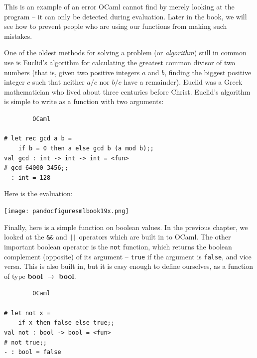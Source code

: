 \documentclass[]{book}
\newcommand{\smspace}{\vspace{4mm}}
\begin{document}
\noindent This is an example of an error OCaml cannot find by merely looking at the program -- it can only be detected during evaluation. Later in the book, we will see how to prevent people who are using our functions from making such mistakes.

One of the oldest methods for solving a problem (or \textit{algorithm}) still in common use is Euclid's algorithm for calculating the greatest common divisor of two numbers (that is, given two positive integers $a$ and $b$, finding the biggest positive integer $c$ such that neither $a / c$ nor $b / c$ have a remainder). Euclid was a Greek mathematician who lived about three centuries before Christ. Euclid's algorithm is simple to write as a function with two arguments:

\smspace
\noindent\verb!        OCaml!\\
\noindent\\
\noindent\verb!# let rec gcd a b =!\\
\noindent\verb!    if b = 0 then a else gcd b (a mod b);;!\\
\noindent\verb!val gcd : int -> int -> int = <fun>!\\
\noindent\texttt{\# gcd 64000 3456;;}\\
\noindent\verb!- : int = 128!
\smspace

\noindent Here is the evaluation:
\medskip
\begin{center}
\noindent\texttt{[image: pandocfiguresmlbook19x.png]}
\end{center}
\medskip

\noindent Finally, here is a simple function on boolean values. In the previous chapter, we looked at the \texttt{\&\&} and \texttt{||} operators which are built in to OCaml. The other important boolean operator is the \texttt{not} function, which returns the boolean complement (opposite) of its argument -- \texttt{true} if the argument is \texttt{false}, and vice versa. This is also built in, but it is easy enough to define ourselves, as a function of type \textsf{\textbf{bool $\rightarrow$ bool}}.

\smspace
\noindent\verb!        OCaml!\\
\noindent\\
\noindent\verb!# let not x =!\\
\noindent\verb!    if x then false else true;;!\\
\noindent\verb!val not : bool -> bool = <fun>!\\
\noindent\texttt{\# not true;;}\\
\noindent\verb!- : bool = false!
\smspace
\end{document}
